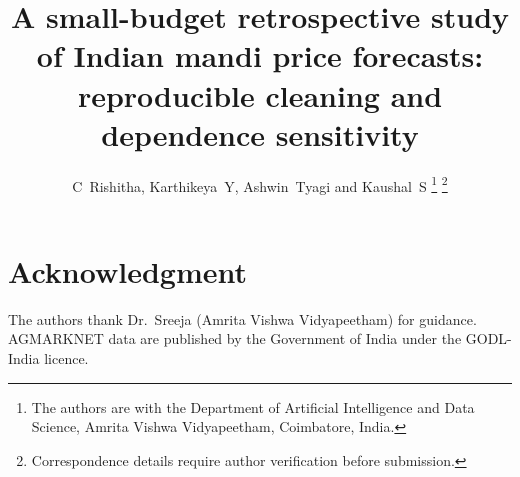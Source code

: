 \documentclass[journal]{IEEEtran}
\begin{document}
\title{A small-budget retrospective study of Indian mandi price forecasts: reproducible cleaning and dependence sensitivity}

\author{C~Rishitha, Karthikeya~Y, Ashwin~Tyagi and Kaushal~S%
\thanks{The authors are with the Department of Artificial Intelligence and Data Science, Amrita Vishwa Vidyapeetham, Coimbatore, India.}%
\thanks{Correspondence details require author verification before submission.}}


\maketitle














\section*{Acknowledgment}
The authors thank Dr.~Sreeja (Amrita Vishwa Vidyapeetham) for guidance. AGMARKNET data are published by the Government of India under the GODL-India licence.



\end{document}
